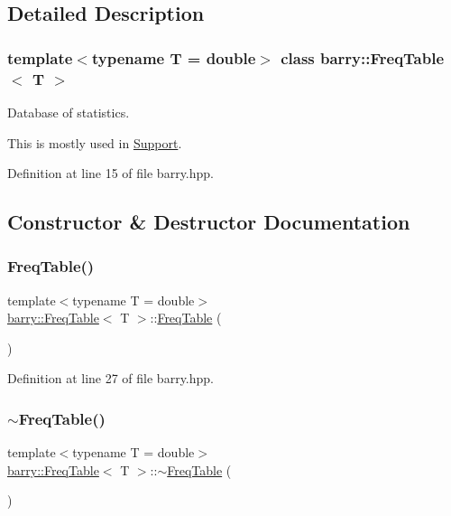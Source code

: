 \subsection{Detailed Description}
\subsubsection*{template$<$typename T = double$>$\newline
class barry\+::\+Freq\+Table$<$ T $>$}

Database of statistics. 

This is mostly used in {\ttfamily \hyperlink{classbarry_1_1_support}{Support}}. 

Definition at line 15 of file barry.\+hpp.



\subsection{Constructor \& Destructor Documentation}
\mbox{\label{classbarry_1_1_freq_table_aea4b22f8097950c3d78e81ab2ed38ae1}} 
\subsubsection{\texorpdfstring{Freq\+Table()}{FreqTable()}}
{\footnotesize\ttfamily template$<$typename T  = double$>$ \\
\hyperlink{classbarry_1_1_freq_table}{barry\+::\+Freq\+Table}$<$ T $>$\+::\hyperlink{classbarry_1_1_freq_table}{Freq\+Table} (\begin{DoxyParamCaption}{ }\end{DoxyParamCaption})\hspace{0.3cm}{\ttfamily [inline]}}



Definition at line 27 of file barry.\+hpp.

\mbox{\label{classbarry_1_1_freq_table_a420a7e4e6740ed7f2b0db1a238f53713}} 
\subsubsection{\texorpdfstring{$\sim$\+Freq\+Table()}{~FreqTable()}}
{\footnotesize\ttfamily template$<$typename T  = double$>$ \\
\hyperlink{classbarry_1_1_freq_table}{barry\+::\+Freq\+Table}$<$ T $>$\+::$\sim$\hyperlink{classbarry_1_1_freq_table}{Freq\+Table} (\begin{DoxyParamCaption}{ }\end{DoxyParamCaption})\hspace{0.3cm}{\ttfamily [inline]}}



